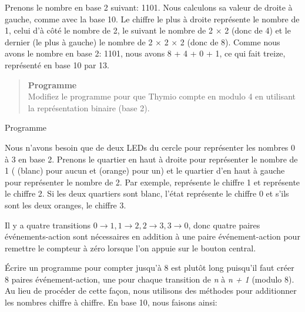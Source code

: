 Prenons le nombre en base 2 suivant: 1101. Nous calculons sa valeur de droite à gauche, comme avec la base 10. Le chiffre le plus à droite représente le nombre de 1, celui d'à côté le nombre de 2, le suivant le nombre de 2 $\times$ 2 (donc de 4) et le dernier (le plus à gauche) le nombre de 2 $\times$ 2 $\times$ 2 (donc de 8). Comme nous avons le nombre en base 2: 1101, nous avons 8 + 4 + 0 + 1, ce qui fait treize, représenté en base 10 par 13.


\begin{quote}
\textbf{Programme}\\
Modifiez le programme pour que Thymio compte en modulo 4 en utilisant la représentation binaire (base 2).
\end{quote}

{\raggedleft \hfill Programme }

Nous n'avons besoin que de deux LEDs du cercle pour représenter les nombres 0 à 3 en base 2. Prenons le quartier en haut à droite pour représenter le nombre de 1 ( (blanc) pour aucun et  (orange) pour un) et le quartier d'en haut à gauche pour représenter le nombre de 2. Par exemple,  représente le chiffre 1 et  représente le chiffre 2. Si les deux quartiers sont blanc, l'état représente le chiffre 0 et s'ils sont les deux oranges, le chiffre 3.

Il y a quatre transitions $0\rightarrow 1, 1\rightarrow 2, 2
\rightarrow 3, 3\rightarrow 0$, donc quatre paires événements-action sont nécessaires en addition à une paire événement-action pour remettre le compteur à zéro lorsque l'on appuie sur le bouton central.


\medskip


\medskip




Écrire un programme pour compter jusqu'à 8 est plutôt long puisqu'il faut créer 8 paires événement-action, une pour chaque transition de \emph{n} à \emph{n + 1} (modulo 8). Au lieu de procéder de cette façon, nous utilisons des méthodes pour additionner les nombres chiffre à chiffre. En base 10, nous faisons ainsi:


